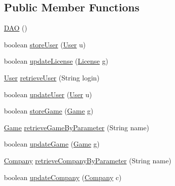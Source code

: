 \subsection*{Public Member Functions}
\begin{DoxyCompactItemize}
\item 
\hyperlink{classes_1_1deusto_1_1server_1_1db_1_1dao_1_1_d_a_o_a1f12a4ca454651d41896e45c42db8f90}{D\+AO} ()
\item 
boolean \hyperlink{classes_1_1deusto_1_1server_1_1db_1_1dao_1_1_d_a_o_acb146e96959c340ef828ef8e36b4283c}{store\+User} (\hyperlink{classes_1_1deusto_1_1server_1_1db_1_1data_1_1_user}{User} u)
\item 
boolean \hyperlink{classes_1_1deusto_1_1server_1_1db_1_1dao_1_1_d_a_o_a98774e8d93cdd4d8d104a197bd37d4e1}{update\+License} (\hyperlink{classes_1_1deusto_1_1server_1_1db_1_1data_1_1_license}{License} g)
\item 
\hyperlink{classes_1_1deusto_1_1server_1_1db_1_1data_1_1_user}{User} \hyperlink{classes_1_1deusto_1_1server_1_1db_1_1dao_1_1_d_a_o_a8c316b4c3bf246d00fb2b423a603ebe6}{retrieve\+User} (String login)
\item 
boolean \hyperlink{classes_1_1deusto_1_1server_1_1db_1_1dao_1_1_d_a_o_a7f6ed77294fe1f61cbebbea410cef6e0}{update\+User} (\hyperlink{classes_1_1deusto_1_1server_1_1db_1_1data_1_1_user}{User} u)
\item 
boolean \hyperlink{classes_1_1deusto_1_1server_1_1db_1_1dao_1_1_d_a_o_a7484309d9b9b39c24cd7d0413a90c468}{store\+Game} (\hyperlink{classes_1_1deusto_1_1server_1_1db_1_1data_1_1_game}{Game} g)
\item 
\hyperlink{classes_1_1deusto_1_1server_1_1db_1_1data_1_1_game}{Game} \hyperlink{classes_1_1deusto_1_1server_1_1db_1_1dao_1_1_d_a_o_a5ac74c9e59db9f20336d6e68d77c6ed8}{retrieve\+Game\+By\+Parameter} (String name)
\item 
boolean \hyperlink{classes_1_1deusto_1_1server_1_1db_1_1dao_1_1_d_a_o_ae7540010b43f96c5e50995a8376614e7}{update\+Game} (\hyperlink{classes_1_1deusto_1_1server_1_1db_1_1data_1_1_game}{Game} g)
\item 
\hyperlink{classes_1_1deusto_1_1server_1_1db_1_1data_1_1_company}{Company} \hyperlink{classes_1_1deusto_1_1server_1_1db_1_1dao_1_1_d_a_o_af3dc3f84b3ea6981bd5e93d54ab45169}{retrieve\+Company\+By\+Parameter} (String name)
\item 
boolean \hyperlink{classes_1_1deusto_1_1server_1_1db_1_1dao_1_1_d_a_o_a0748467c3346a5bcdcd79b508562b6dc}{update\+Company} (\hyperlink{classes_1_1deusto_1_1server_1_1db_1_1data_1_1_company}{Company} c)

\end{DoxyCompactItemize}
